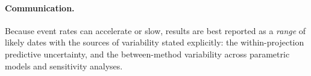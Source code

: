 \documentclass[11pt]{article}
\begin{document}
\paragraph{Communication.} Because event rates can accelerate or slow, results
are best reported as a \emph{range} of likely dates with the sources of
variability stated explicitly: the within-projection predictive uncertainty,
and the between-method variability across parametric models and sensitivity
analyses.
\end{document}
